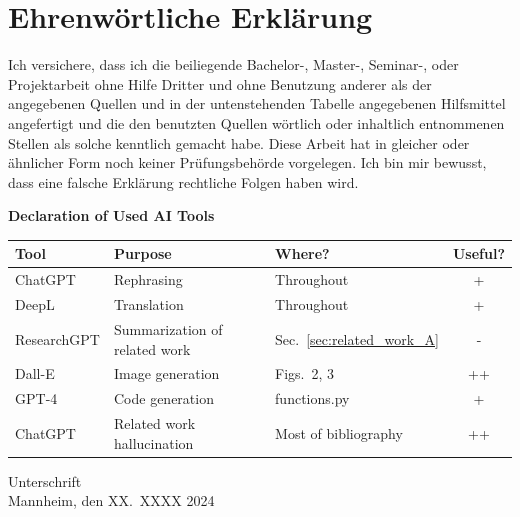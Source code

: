 \documentclass[a4paper,oneside,bibliography=totoc]{scrbook}
\begin{document}
\backmatter


\label{bibliography}

\chapter{Ehrenwörtliche Erklärung}
\label{cha:ehrenwoertlicheErklaerung}

Ich versichere, dass ich die beiliegende Bachelor-, Master-, Seminar-, oder
Projektarbeit ohne Hilfe Dritter und ohne Benutzung anderer als der angegebenen
Quellen und in der untenstehenden Tabelle angegebenen Hilfsmittel angefertigt
und die den benutzten Quellen wörtlich oder inhaltlich entnommenen Stellen als
solche kenntlich gemacht habe. Diese Arbeit hat in gleicher oder ähnlicher Form
noch keiner Prüfungsbehörde vorgelegen. Ich bin mir bewusst, dass eine falsche
Erklärung rechtliche Folgen haben wird.

\begin{center}
  \textbf{Declaration of Used AI Tools} \\[.3em]
  \begin{tabularx}{\textwidth}{lXlc}
    \toprule
    Tool & Purpose & Where? & Useful? \\
    \midrule
    ChatGPT & Rephrasing & Throughout & + \\
    DeepL & Translation & Throughout & + \\
    ResearchGPT & Summarization of related work & Sec.~\ref{sec:related_work_A} & - \\
    Dall-E & Image generation & Figs.~2, 3 & ++ \\
    GPT-4 & Code generation & functions.py & + \\
    ChatGPT & Related work hallucination & Most of bibliography & ++ \\
    \bottomrule
  \end{tabularx}
\end{center}

\vspace{2cm}
\noindent Unterschrift\\
\noindent Mannheim, den XX.~XXXX 2024 \hfill
\end{document}
